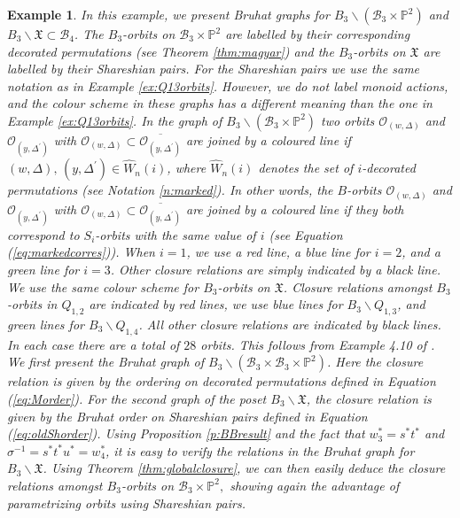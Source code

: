\documentclass[12pt]{amsart}
\numberwithin{equation}{section}
\newtheorem{exam}[thm]{Example}
\newcommand{\cW}{{ W}}
\newcommand{\B}{\mathcal{B}}
\begin{document}
\begin{exam}\label{ex:3by3}
In this example, we present Bruhat graphs for $B_{3}\backslash (\B_{3}\times\mathbb{P}^{2})$ and $B_{3}\backslash\mathfrak{X}\subset \B_{4}$.  The $B_{3}$-orbits on $\B_{3}\times\mathbb{P}^{2}$ are labelled by their corresponding decorated permutations (see Theorem \ref{thm:magyar}) and the $B_{3}$-orbits on $\mathfrak{X}$ are labelled by their Shareshian pairs.  For the Shareshian pairs we use the same notation as in Example \ref{ex:Q13orbits}.  However, we do not label monoid actions, and the colour scheme in these graphs has a different meaning than the one in Example \ref{ex:Q13orbits}.  In the graph of $B_{3}\backslash( \B_{3}\times\mathbb{P}^{2})$ two orbits $\mathcal{O}_{(w,\Delta)}$ and $\mathcal{O}_{(y,\Delta^{\prime})}$ with $\mathcal{O}_{(w,\Delta)}\subset \overline{ \mathcal{O}_{(y,\Delta^{\prime})}}$ are joined by a coloured line if $(w,\Delta),\, (y, \Delta^{\prime})\in\widehat{\cW}_{n}(i)$, where $\widehat{\cW}_{n}(i)$ denotes the set of $i$-decorated permutations (see Notation \ref{n:marked}).  In other words, the $B$-orbits $\mathcal{O}_{(w,\Delta)}$ and $\mathcal{O}_{(y,\Delta^{\prime})}$ with $\mathcal{O}_{(w,\Delta)}\subset \overline{ \mathcal{O}_{(y,\Delta^{\prime})}}$ are joined by a coloured line if they both correspond to $S_{i}$-orbits with the same value of $i$ (see Equation (\ref{eq:markedcorres})).  When $i=1$, we use a red line, a blue line for $i=2$, and a green line for $i=3$.  Other closure relations are simply indicated by a black line.  We use the same colour scheme for $B_{3}$-orbits on $\mathfrak{X}$.  Closure relations amongst $B_{3}$-orbits in $Q_{1,2}$ are indicated by red lines, we use blue lines for $B_{3}\backslash Q_{1,3}$, and green lines for $B_{3}\backslash Q_{1,4}$.  All other closure relations are indicated by black lines.   
In each case there are a total of $28$ orbits.  This follows from Example 4.10 of \cite{Siorbits}.  We first present the Bruhat graph of $B_{3}\backslash(\B_{3}\times \B_{3}\times\mathbb{P}^{2})$.  Here the closure relation is given by the ordering on decorated permutations defined in Equation (\ref{eq:Morder}).  For the second graph of the poset $B_{3}\backslash\mathfrak{X}$, the closure relation is given by the Bruhat order on Shareshian pairs defined in Equation (\ref{eq:oldShorder}).  Using Proposition \ref{p:BBresult} and the fact that $w_{3}^{*}=s^{*}t^{*}$ and $\sigma^{-1}=s^{*}t^{*}u^{*}=w_{4}^{*}$, it is easy to verify the relations in the Bruhat graph for $B_{3}\backslash\mathfrak{X}$.  Using Theorem \ref{thm:globalclosure}, we can then easily deduce the closure relations amongst $B_{3}$-orbits on $\B_{3}\times\mathbb{P}^{2},$ showing again the advantage of parametrizing orbits using Shareshian pairs.  


\end{exam}
\end{document}

